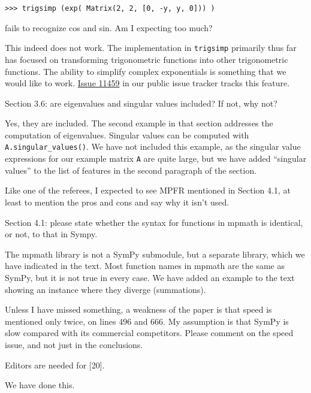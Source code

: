 \documentclass[answers,12pt]{exam}
\begin{document}
\begin{questions}
\begin{verbatim}
>>> trigsimp (exp( Matrix(2, 2, [0, -y, y, 0])) )
\end{verbatim}
fails to recognize cos and
sin. Am I expecting too much?
\begin{solution}
  This indeed does not work. The implementation in \verb|trigsimp| primarily
  thus far has focused on transforming trigonometric functions into other
  trigonometric functions. The ability to simplify complex exponentials is
  something that we would like to work.
  \href{https://github.com/sympy/sympy/issues/11459}{Issue 11459} in our
  public issue tracker tracks this feature.
\end{solution}
\question Section 3.6: are eigenvalues and singular
values included? If not, why not?
\begin{solution}
Yes, they are included.  The second example in that section addresses the computation of
eigenvalues.  Singular values can be computed with
\texttt{A.singular\_values()}. We have not included this example, as the
singular value expressions for our example matrix \texttt{A} are quite large,
but we have added ``singular values'' to the list of features in the second
paragraph of the section.
\end{solution}
\question Like one of the referees, I expected to
see MPFR mentioned in Section 4.1, at least to mention the pros and cons and
say why it isn't used.
\begin{solution}
\end{solution}
\question Section 4.1: please state whether the syntax for
functions in mpmath is identical, or not, to that in Sympy.
\begin{solution}
The mpmath library is not a SymPy submodule, but a separate library,
which we have indicated in the text. Most function names in mpmath are the same as SymPy, but it is not true in every case. We have
added an example to the text showing an instance where they diverge
(summations).
\end{solution}
\question Unless I have
missed something, a weakness of the paper is that speed is mentioned only
twice, on lines 496 and 666. My assumption is that SymPy is slow compared with
its commercial competitors. Please comment on the speed issue, and not just in
the conclusions.
\begin{solution}
\end{solution}
\question Editors are needed for [20].
\begin{solution}
We have done this.
\end{solution}
\end{questions}
\end{document}
